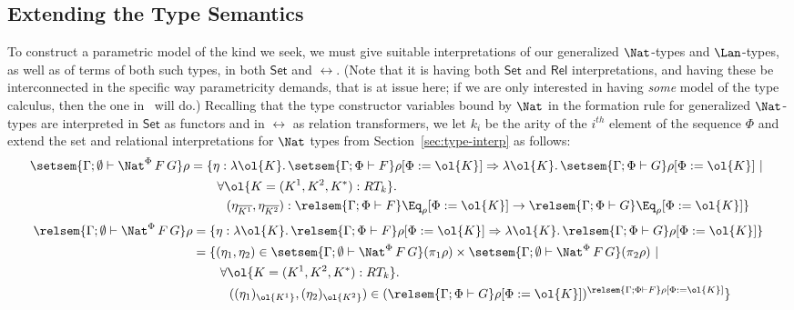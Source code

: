 \documentclass{lmcs}
\theoremstyle{plain}\newtheorem{satz}[thm]{Satz}
\newcommand{\set}{\mathsf{Set}}
\begin{document}
\subsection{Extending the Type Semantics}\label{sec:type-sem}

To construct a parametric model of the kind we seek, we must give
suitable interpretations of our generalized $\Nat$-types and
$\Lan$-types, as well as of terms of both such types, in both $\set$
and $\rel$. (Note that it is having both $\mathsf{Set}$ and
$\mathsf{Rel}$ interpretations, and having these be interconnected in
the specific way parametricity demands, that is at issue here; if we
are only interested in having {\em some} model of the type calculus,
then the one in~\cite{jp19} will do.) Recalling that the type
constructor variables bound by $\Nat$ in the formation rule for
generalized $\Nat$-types are interpreted in $\set$ as functors and in
$\rel$ as relation transformers, we let $k_i$ be the arity of the
$i^{th}$ element of the sequence $\Phi$ and extend the set and
relational interpretations for $\Nat$ types from
Section~\ref{sec:type-interp} as follows:
\begin{align*}
\setsem{\Gamma; \emptyset \vdash \Nat^\Phi\,F\,G}\rho
&= \{\eta : \lambda \ol{K}. \,\setsem{\Gamma; \Phi \vdash F}\rho[\Phi := \ol{K}] 
  \Rightarrow \lambda \ol{K}.\,\setsem{\Gamma; \Phi \vdash G}\rho[\Phi := \ol{K}]~|~\\ 
&\hspace{0.3in} \forall \ol{K = (K^1, K^2, K^*) : RT_k}.\\
&\hspace{0.4in} (\eta_{\overline{K^1}}, \eta_{\overline{K^2}})
: \relsem{\Gamma; \Phi \vdash F}\Eq_{\rho}[\Phi := \ol{K}]
\rightarrow \relsem{\Gamma; \Phi \vdash G}\Eq_{\rho}[\Phi := \ol{K}] \} \\
\end{align*}
\begin{align*}
\relsem{\Gamma; \emptyset \vdash \Nat^\Phi \,F\,G}\rho
&= \{\eta : \lambda \ol{K}.\,\relsem{\Gamma; \Phi \vdash F}\rho[\Phi := \ol{K}]
\Rightarrow \lambda \ol{K}. \,\relsem{\Gamma; \Phi \vdash G}\rho[\Phi := \ol{K}]\}\\
&=
  \{(\eta_1,\eta_2) \in \setsem{\Gamma; \emptyset
    \vdash \Nat^\Phi
    \,F\,G} (\pi_1 \rho) \times \setsem{ 
    \Gamma;\emptyset
    \vdash \Nat^\Phi \,F\,G} (\pi_2
  \rho)~|~\\
& \hspace{0.3in} \forall \ol{K = (K^1, K^2, K^*) : RT_k}.\\
& \hspace{0.4in} ((\eta_1)_{\ol{K^1}},(\eta_2)_{\ol{K^2}}) \in
  (\relsem{\Gamma; \Phi \vdash G}\rho[\Phi := \ol{K}])^{\relsem{\Gamma;\Phi\vdash F}\rho[\Phi := \ol{K}]} \}\\  
\end{align*}
\end{document}
